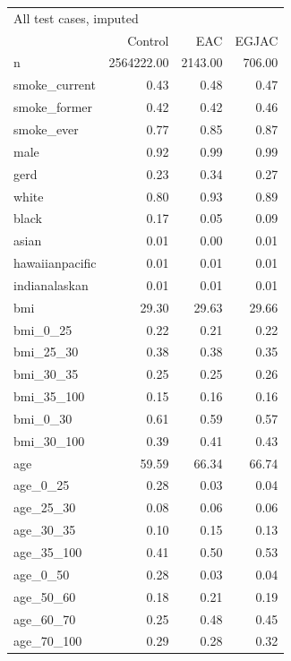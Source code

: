 \documentclass[12pt]{article}
\begin{document}
\begin{minipage}{0.50\linewidth}\scriptsize
\begin{tabular}{lrrr}
  \toprule
  \multicolumn{4}{l}{All test cases, imputed} \\
 & Control & EAC & EGJAC \\ 
  \midrule
n & 2564222.00 & 2143.00 & 706.00 \\ 
  smoke\_current & 0.43 & 0.48 & 0.47 \\ 
  smoke\_former & 0.42 & 0.42 & 0.46 \\ 
  smoke\_ever & 0.77 & 0.85 & 0.87 \\ 
  male & 0.92 & 0.99 & 0.99 \\ 
  gerd & 0.23 & 0.34 & 0.27 \\ 
  white & 0.80 & 0.93 & 0.89 \\ 
  black & 0.17 & 0.05 & 0.09 \\ 
  asian & 0.01 & 0.00 & 0.01 \\ 
  hawaiianpacific & 0.01 & 0.01 & 0.01 \\ 
  indianalaskan & 0.01 & 0.01 & 0.01 \\ 
  bmi & 29.30 & 29.63 & 29.66 \\ 
  bmi\_0\_25 & 0.22 & 0.21 & 0.22 \\ 
  bmi\_25\_30 & 0.38 & 0.38 & 0.35 \\ 
  bmi\_30\_35 & 0.25 & 0.25 & 0.26 \\ 
  bmi\_35\_100 & 0.15 & 0.16 & 0.16 \\ 
  bmi\_0\_30 & 0.61 & 0.59 & 0.57 \\ 
  bmi\_30\_100 & 0.39 & 0.41 & 0.43 \\ 
  age & 59.59 & 66.34 & 66.74 \\ 
  age\_0\_25 & 0.28 & 0.03 & 0.04 \\ 
  age\_25\_30 & 0.08 & 0.06 & 0.06 \\ 
  age\_30\_35 & 0.10 & 0.15 & 0.13 \\ 
  age\_35\_100 & 0.41 & 0.50 & 0.53 \\ 
  age\_0\_50 & 0.28 & 0.03 & 0.04 \\ 
  age\_50\_60 & 0.18 & 0.21 & 0.19 \\ 
  age\_60\_70 & 0.25 & 0.48 & 0.45 \\ 
  age\_70\_100 & 0.29 & 0.28 & 0.32 \\ 
   \bottomrule
\end{tabular}
\end{minipage} \hfill
\end{document}
